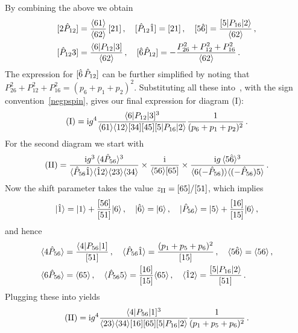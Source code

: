 By combining the above we obtain
\begin{align} \begin{aligned}
\bev{2 \hat{P}_{12}} &= \frac{\vev{61}}{\vev{62}}\, \bev{21}\, , \quad
\bev{\hat{P}_{12} \hat{1}} =\bev{21}\, , \quad  \bev{5\hat 6} = \frac{[5|P_{16}|2\rangle}{\spA 62}\, , \\
\bev{\hat{P}_{12} 3} &= \frac{\langle 6 | P_{12}|3]}{\vev{62}}\, , \quad
\bev{\hat 6 \hat{P}_{12}} = - \frac{P_{26}^{2}+P_{12}^{2}+P_{16}^{2}}{\vev{62}} \,.
\end{aligned} \end{align}
The expression for $[\hat 6 \,\hat P_{12}]$ can be further simplified by noting that $P_{26}^{2}+P_{12}^{2}+P_{16}^{2} = (p_6+p_1+p_2)^2$.
Substituting all these into~, with the sign convention~\eqref{negpspin}, gives our final expression for diagram (I):
\begin{align}
\text{(I)} = \mathrm{i} g^4 \frac{\langle 6 | P_{12} | 3 ]^3}{\langle 6 1 \rangle \langle 1 2 \rangle [ 3 4 ] [ 4 5 ] [ 5 | P_{16} | 2 \rangle} \frac{1}{(p_6+p_1+p_2)^2}\,.
\end{align}
For the second diagram we start with
\begin{align} \label{eq:6gdiagII}
\text{(II)} =  \frac{\mathrm{i} g^3 \, \langle 4 \hat P_{56} \rangle^{3}}{\langle\hat P_{56}\hat{1}\rangle\langle\hat{1}2\rangle
\langle23\rangle\langle34\rangle}\times \frac{\mathrm{i}}{\langle56\rangle[65]} \times \frac{\mathrm{i} g \, \langle5\hat 6\rangle^{3}}
{\langle6 (-\hat{P}_{56})\rangle\langle(-\hat{P}_{56}) 5\rangle} \,.
\end{align}
Now the shift parameter takes the value $z_{\text{II}} = [ 6 5 ] / [ 5 1 ]$, which implies
\begin{align}
|\hat{1}\rangle = |1\rangle + \frac{[ 5 6 ]}{[ 5 1 ]} |6\rangle \,, \quad 
|\hat{6}\rangle = |6\rangle \,, \quad 
|\hat{P}_{56}\rangle = |5\rangle + \frac{[ 1 6 ]}{[ 1 5 ]} |6\rangle \,,
\end{align}
and hence
\begin{align} \begin{aligned}
\langle4 \hat{P}_{56}\rangle &= \frac{\langle 4 | P_{56}|1]}{[51]}\, , \quad
\langle\hat{P}_{56} \hat{1}\rangle = \frac{(p_1+p_5+p_6)^2}{[15]}\, ,\quad
\langle5\hat{6}\rangle = \langle56\rangle\, ,\\ 
\langle6 \hat{P}_{56}\rangle&= \langle65\rangle\, ,\quad
\langle\hat{P}_{56} 5\rangle= \frac{[16]}{[15]} \langle65\rangle\, , \quad
\langle\hat{1}2\rangle= \frac{[5|P_{16}|2\rangle}{[51]}\, .
\end{aligned} \end{align}
Plugging these into  yields
\begin{align}
\text{(II)} = \mathrm{i} g^4 \frac{\langle 4 | P_{56} | 1 ]^3}{ \langle23\rangle \langle34\rangle [16][65] [ 5 | P_{16} | 2 \rangle }  \frac{1}{(p_1+p_5+p_6)^2} \,.
\end{align}
